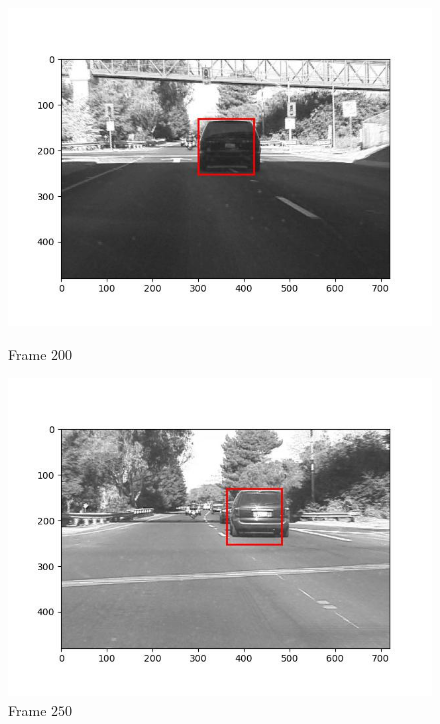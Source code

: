 \begin{figure}[H]
\begin{minipage}{.49\textwidth}
    \includegraphics[width=\textwidth]{./figures/lk/car1/frame000200.jpg}
    \caption{Frame $200$}
  \end{minipage}
  \hfill
  \begin{minipage}{.49\textwidth}
    \centering
    \includegraphics[width=\textwidth]{./figures/lk/car1/frame000250.jpg}
    \caption{Frame $250$}
  \end{minipage}
\end{figure}


